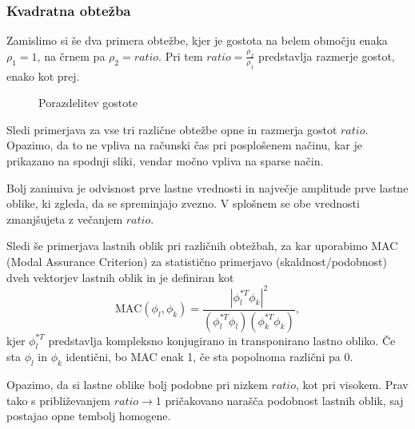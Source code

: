 
\subsubsection{Kvadratna obtežba}

Zamislimo si še dva primera obtežbe, kjer je gostota na belem območju enaka $\rho_1=1$, na črnem pa $\rho_2=ratio$. Pri tem $ratio=\frac{\rho_2}{\rho_1}$ predstavlja razmerje gostot, enako kot prej.
\begin{figure}[H]
    \centering
    \caption{Porazdelitev gostote}
\end{figure}

Sledi primerjava za vse tri različne obtežbe opne in razmerja gostot $ratio$. Opazimo, da to ne vpliva na računski čas pri posplošenem načinu, kar je prikazano na spodnji sliki, vendar močno vpliva na sparse način.

Bolj zanimiva je odvisnost prve lastne vrednosti in največje amplitude prve lastne oblike, ki zgleda, da se spreminjajo zvezno. V splošnem se obe vrednosti zmanjšujeta z večanjem $ratio$.


Sledi še primerjava lastnih oblik pri različnih obtežbah, za kar uporabimo MAC (Modal Assurance Criterion) za statistično primerjavo (skaldnost/podobnost) dveh vektorjev lastnih oblik in je definiran kot
\begin{equation}
    \text{MAC}(\phi_l, \phi_k) = \frac{|\phi_l^{*T} \phi_k|^2}{(\phi_l^{*T} \phi_l)(\phi_k^{*T} \phi_k)},
\end{equation}
kjer $\phi_l^{*T}$ predstavlja kompleksno konjugirano in transponirano lastno obliko. Če sta $\phi_l$ in $\phi_k$ identični, bo MAC enak 1, če sta popolnoma različni pa 0.

Opazimo, da si lastne oblike bolj podobne pri nizkem $ratio$, kot pri visokem. Prav tako s približevanjem $ratio \rightarrow 1$ pričakovano narašča podobnost lastnih oblik, saj postajao opne tembolj homogene.


